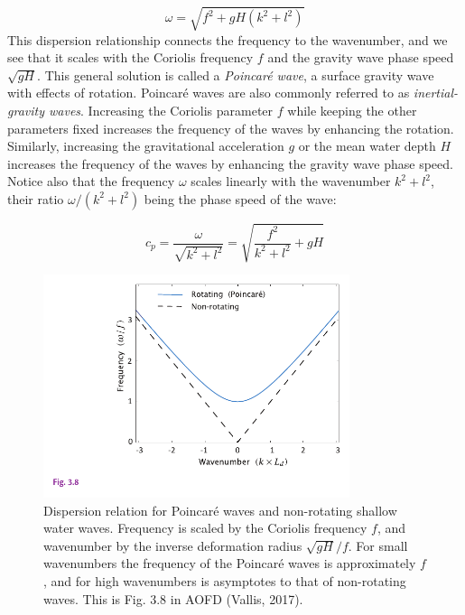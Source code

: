 \documentclass[12pt]{article}
\numberwithin{equation}{section}
\numberwithin{figure}{section}
\numberwithin{table}{section}
\begin{document}
\begin{equation}
  \omega = \sqrt{f^2 + gH(k^2 + l^2)}
  \label{eq:swe_dispersion}
\end{equation}
This dispersion relationship connects the frequency to the wavenumber, and we
see that it scales with the Coriolis frequency $f$ and the gravity wave
phase speed $\sqrt{gH}$.
This general solution is called a \textit{Poincaré wave},
a surface gravity wave with effects of rotation.
Poincaré waves are also commonly referred to as
\textit{inertial-gravity waves}.
Increasing the Coriolis parameter $f$ while keeping the other parameters fixed
increases the frequency of the waves by enhancing the rotation.
Similarly, increasing the gravitational acceleration $g$ or the mean water depth
$H$ increases the frequency of the waves by enhancing the gravity wave phase
speed.
Notice also that the frequency $\omega$ scales linearly with the wavenumber
$k^2 + l^2$, their ratio $\omega / (k^2 + l^2)$ being the phase speed of the
wave:

\begin{equation}
  c_p = \frac{\omega}{\sqrt{k^2 + l^2}} = \sqrt{\frac{f^2}{k^2 + l^2} + gH}
\end{equation}

\begin{figure}[h]
  \centering
  \includegraphics[width=0.8\textwidth]{assets/fig_swe_dispersion.pdf}
  \caption{
    Dispersion relation for Poincaré waves and non-rotating shallow water
    waves.
    Frequency is scaled by the Coriolis frequency $f$, and wavenumber by the
    inverse deformation radius $\sqrt{gH}/f$.
    For small wavenumbers the frequency of the Poincaré waves is approximately
    $f$, and for high wavenumbers is asymptotes to that of non-rotating waves.
    This is Fig. 3.8 in AOFD (Vallis, 2017).
  }
  \label{fig:swe_dispersion}
\end{figure}
\end{document}
